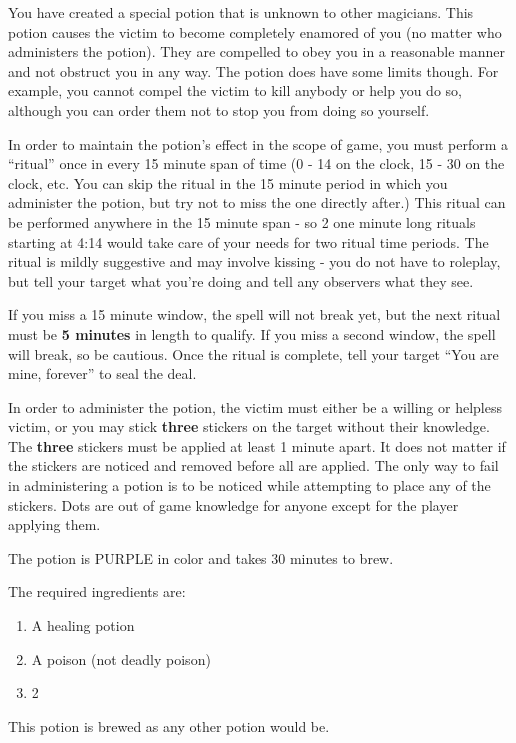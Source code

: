 \documentclass[green]{NeptuneBall}
\begin{document}
\name{\gLove{}}

You have created a special potion that is unknown to other magicians. This potion causes the victim to become completely enamored of you (no matter who administers the potion). They are compelled to obey you in a reasonable manner and not obstruct you in any way. The potion does have some limits though. For example, you cannot compel the victim to kill anybody or help you do so, although you can order them not to stop you from doing so yourself.

In order to maintain the potion's effect in the scope of game, you must perform a ``ritual'' once in every 15 minute span of time (0 - 14 on the clock, 15 - 30 on the clock, etc. You can skip the ritual in the 15 minute period in which you administer the potion, but try not to miss the one directly after.) This ritual can be performed anywhere in the 15 minute span - so 2 one minute long rituals starting at 4:14 would take care of your needs for two ritual time periods. The ritual is mildly suggestive and may involve kissing - you do not have to roleplay, but tell your target what you're doing and tell any observers what they see.

If you miss a 15 minute window, the spell will not break yet, but the next ritual must be {\bf 5 minutes} in length to qualify. If you miss a second window, the spell will break, so be cautious. Once the ritual is complete, tell your target ``You are mine, forever'' to seal the deal.

In order to administer the potion, the victim must either be a willing or helpless victim, or you may stick {\bf three} stickers on the target without their knowledge. The {\bf three} stickers must be applied at least 1 minute apart. It does not matter if the stickers are noticed and removed before all are applied. The only way to fail in administering a potion is to be noticed while attempting to place any of the stickers. Dots are out of game knowledge for anyone except for the player applying them.

The potion is PURPLE in color and takes 30 minutes to brew.

The required ingredients are:
\begin{enumerate}
\item A healing potion 
\item A poison (not deadly poison)
\item 2 \iPearl{}
\end{enumerate}

This potion is brewed as any other potion would be.\\
\end{document}
